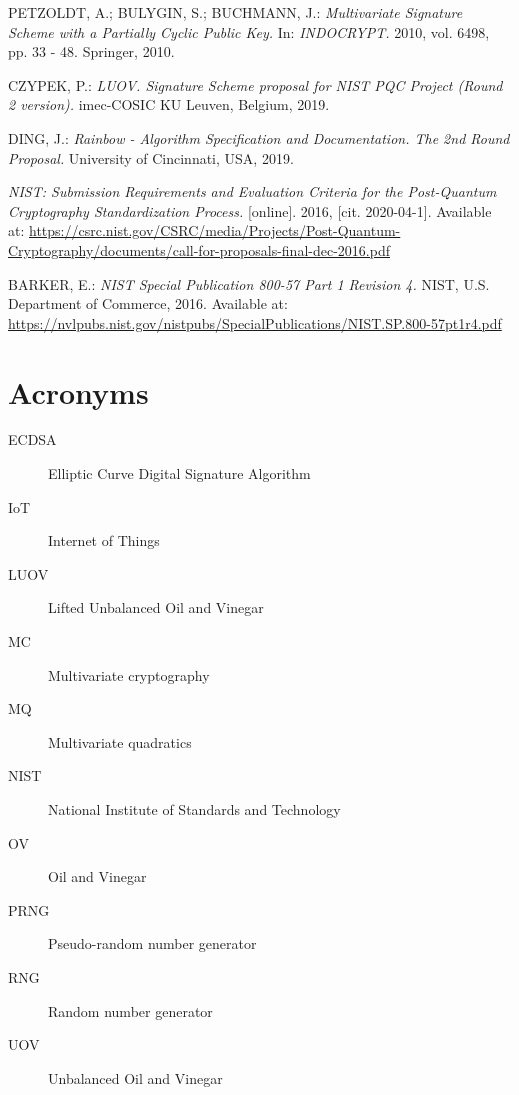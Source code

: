 \documentclass[thesis=M,english]{FITthesis}[2019/12/23]
\begin{document}
\begin{thebibliography}{9}
PETZOLDT, A.; BULYGIN, S.; BUCHMANN, J.: \textit{Multivariate
Signature Scheme with a Partially Cyclic Public Key.} In: \textit{INDOCRYPT.} 2010, vol. 6498, pp. 33 - 48. Springer, 2010.

CZYPEK, P.: \textit{LUOV. Signature Scheme proposal for NIST PQC Project (Round 2 version).} imec-COSIC KU Leuven, Belgium, 2019.

DING, J.: \textit{Rainbow - Algorithm Specification and Documentation. The 2nd Round Proposal.} University of Cincinnati, USA, 2019.

\textit{NIST: Submission Requirements and Evaluation Criteria for the Post-Quantum Cryptography Standardization Process.} [online]. 2016, [cit. 2020-04-1]. Available at: \url{https://csrc.nist.gov/CSRC/media/Projects/Post-Quantum-Cryptography/documents/call-for-proposals-final-dec-2016.pdf}

BARKER, E.: \textit{NIST Special Publication 800-57 Part 1 Revision 4.} NIST, U.S. Department of Commerce, 2016. Available at: \url{https://nvlpubs.nist.gov/nistpubs/SpecialPublications/NIST.SP.800-57pt1r4.pdf}

\end{thebibliography}
\appendix

\chapter{Acronyms}
\begin{description}
\item[ECDSA] Elliptic Curve Digital Signature Algorithm
\item[IoT] Internet of Things
\item[LUOV] Lifted Unbalanced Oil and Vinegar
\item[MC] Multivariate cryptography
\item[MQ] Multivariate quadratics
\item[NIST] National Institute of Standards and Technology
\item[OV] Oil and Vinegar
\item[PRNG] Pseudo-random number generator
\item[RNG] Random number generator
\item[UOV] Unbalanced Oil and Vinegar
\end{description}
\end{document}
